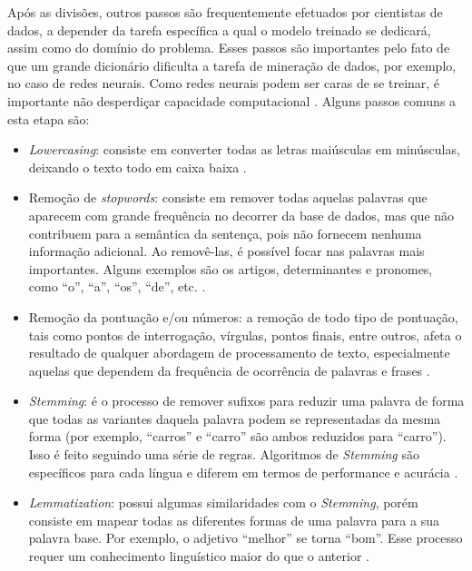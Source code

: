 Após as divisões, outros passos são frequentemente efetuados por cientistas de dados, a depender da tarefa específica a qual o modelo treinado se dedicará, assim como do domínio do problema. Esses passos são importantes pelo fato de que um grande dicionário dificulta a tarefa de mineração de dados, por exemplo, no caso de redes neurais. Como redes neurais podem ser caras de se treinar, é importante não desperdiçar capacidade computacional \cite{transformers_book}. Alguns passos comuns a esta etapa são:
\label{pré-processamento dos dados}
\begin{itemize}
    \item \textit{Lowercasing}: consiste em converter todas as letras maiúsculas em minúsculas, deixando o texto todo em caixa baixa \cite{practical_nlp}.
    \item Remoção de \textit{stopwords}: consiste em remover todas aquelas palavras que aparecem com grande frequência no decorrer da base de dados, mas que não contribuem para a semântica da sentença, pois não fornecem nenhuma informação adicional. Ao removê-las, é possível focar nas palavras mais importantes. Alguns exemplos são os artigos, determinantes e pronomes, como ``o'', ``a'', ``os'', ``de'', etc. \cite{practical_nlp} \cite{etaiwi2017impact}.
    \item Remoção da pontuação e/ou números: a remoção de todo tipo de pontuação, tais como pontos de interrogação, vírgulas, pontos finais, entre outros, afeta o resultado de qualquer abordagem de processamento de texto, especialmente aquelas que dependem da frequência de ocorrência de palavras e frases \cite{etaiwi2017impact}.
    \item \textit{Stemming}: é o processo de remover sufixos para reduzir uma palavra de forma que todas as variantes daquela palavra podem se representadas da mesma forma (por exemplo, ``carros'' e ``carro'' são ambos reduzidos para ``carro''). Isso é feito seguindo uma série de regras. Algoritmos de \textit{Stemming} são específicos para cada língua e diferem em termos de performance e acurácia \cite{practical_nlp} \cite{etaiwi2017impact}.
    \item \textit{Lemmatization}: possui algumas similaridades com o \textit{Stemming}, porém consiste em mapear todas as diferentes formas de uma palavra para a sua palavra base. Por exemplo, o adjetivo ``melhor'' se torna ``bom''. Esse processo requer um conhecimento linguístico maior do que o anterior \cite{practical_nlp}.
\end{itemize}


